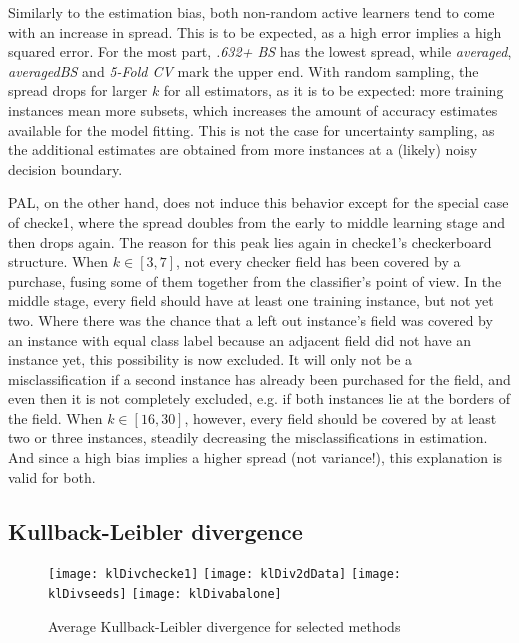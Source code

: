 Similarly to the estimation bias, both non-random active learners tend to come with an increase in spread. This is to be expected, as a high error implies a high squared error. For the most part, \textit{.632+ BS} has the lowest spread, while \textit{averaged}, \textit{averagedBS} and \textit{5-Fold CV} mark the upper end. With random sampling, the spread drops for larger $k$ for all estimators, as it is to be expected: more training instances mean more subsets, which increases the amount of accuracy estimates available for the model fitting. This is not the case for uncertainty sampling, as the additional estimates are obtained from more instances at a (likely) noisy decision boundary.

PAL, on the other hand, does not induce this behavior except for the special case of checke1, where the spread doubles from the early to middle learning stage and then drops again. The reason for this peak lies again in checke1's checkerboard structure. When $k \in [3,7]$, not every checker field has been covered by a purchase, fusing some of them together from the classifier's point of view. In the middle stage, every field should have at least one training instance, but not yet two. Where there was the chance that a left out instance's field was covered by an instance with equal class label because an adjacent field did not have an instance yet, this possibility is now excluded. It will only not be a misclassification if a second instance has already been purchased for the field, and even then it is not completely excluded, e.g. if both instances lie at the borders of the field. When $k \in [16,30]$, however, every field should be covered by at least two or three instances, steadily decreasing the misclassifications in estimation. And since a high bias implies a higher spread (not variance!), this explanation is valid for both.

\subsection{Kullback-Leibler divergence}

\begin{figure}[h]
	\centering
	\texttt{[image: klDivchecke1]}
	\texttt{[image: klDiv2dData]}
	\texttt{[image: klDivseeds]}
	\texttt{[image: klDivabalone]}
	\caption{Average Kullback-Leibler divergence for selected methods}
	\label{fig:klDiv}
\end{figure}

